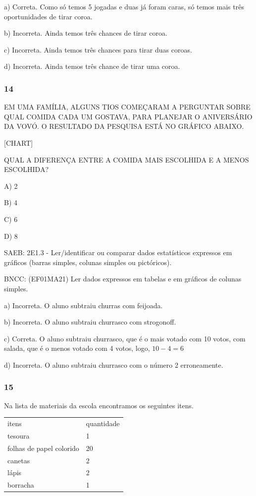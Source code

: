 a) Correta. Como só temos 5 jogadas e duas já foram caras, só temos mais
três oportunidades de tirar coroa.

b) Incorreta. Ainda temos três chances de tirar coroa.

c) Incorreta. Ainda temos três chances para tirar duas coroas.

d) Incorreta. Ainda temos três chance de tirar uma coroa.

\subsubsection{14}\label{section-145}

EM UMA FAMÍLIA, ALGUNS TIOS COMEÇARAM A PERGUNTAR SOBRE QUAL COMIDA CADA
UM GOSTAVA, PARA PLANEJAR O ANIVERSÁRIO DA VOVÓ. O RESULTADO DA PESQUISA
ESTÁ NO GRÁFICO ABAIXO.

{{[}CHART{]}}

QUAL A DIFERENÇA ENTRE A COMIDA MAIS ESCOLHIDA E A MENOS ESCOLHIDA?

A) 2

B) 4

C) 6

D) 8

SAEB: 2E1.3 - Ler/identificar ou comparar dados estatísticos expressos
em gráficos (barras simples, colunas simples ou pictóricos).

BNCC: (EF01MA21) Ler dados expressos em tabelas e em gráficos de colunas
simples.

a) Incorreta. O aluno subtraiu churras com feijoada.

b) Incorreta. O aluno subtraiu churrasco com strogonoff.

c) Correta. O aluno subtraiu churrasco, que é o mais votado com 10
votos, com salada, que é o menos votado com 4 votos, logo,
\(10 - 4 = 6\)

d) Incorreta. O aluno subtraiu churrasco com o número 2 erroneamente.

\subsubsection{15 }\label{section-146}

Na lista de materiais da escola encontramos os seguintes itens.

\begin{longtable}[]{@{}ll@{}}
\toprule
itens & quantidade\tabularnewline
tesoura & 1\tabularnewline
folhas de papel colorido & 20\tabularnewline
canetas & 2\tabularnewline
lápis & 2\tabularnewline
borracha & 1\tabularnewline
\bottomrule
\end{longtable}

